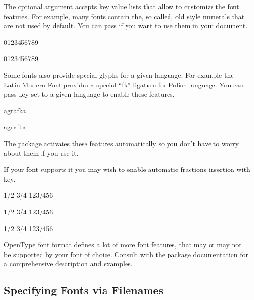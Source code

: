 The optional  argument accepts key value lists that allow to
customize the font features. For example, many fonts contain the, so called,
old style numerals that are not used by default. You can pass
 if you want to use them in your document.
\begin{example}
\setmainfont{Source Serif Pro}
0123456789

\setmainfont[
  Numbers=OldStyle,
]{Source Serif Pro}
0123456789
\end{example}

Some fonts also provide special glyphs for a given language. For example the
Latin Modern Font provides a special \enquote{fk} ligature for Polish language.
You can pass  key set to a given language to enable these
features.
\begin{example}
agrafka

\setmainfont[
  Language=Polish,
]{Latin Modern Roman}
agrafka
\end{example}
The  package activates these features automatically so you
don't have to worry about them if you use it.

If your font supports it you may wish to enable automatic fractions insertion
with  key.
\begin{example}
1/2 3/4 123/456

\setmainfont[
  Fractions=On,
]{Latin Modern Roman}
1/2 3/4 123/456

\setmainfont[
  Fractions=On,
]{Source Serif Pro}
1/2 3/4 123/456
\end{example}

OpenType font format defines a lot of more font features, that may or may not
be supported by your font of choice. Consult with the  package
documentation for a comprehensive description and examples.

\subsection{Specifying Fonts via Filenames}

